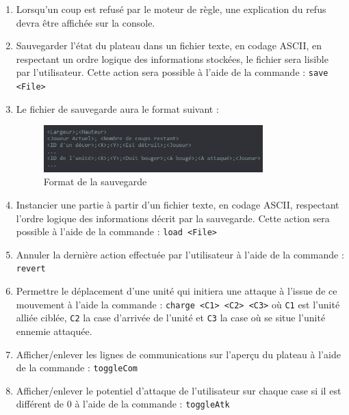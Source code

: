 \documentclass[a4paper]{report}
\begin{document}
\begin{enumerate}
\item Lorsqu'un coup est refusé par le moteur de règle, une explication du refus devra être affichée sur la console.

\item Sauvegarder l'état du plateau dans un fichier texte, en codage ASCII, en respectant un ordre logique des informations stockées, le fichier sera lisible par l'utilisateur. Cette action sera possible à l'aide de la commande : \texttt{save <File>}

\item Le fichier de sauvegarde aura le format suivant :
\begin{figure}[h]
\caption{Format de la sauvegarde}
\centering
\includegraphics[width=0.8\textwidth]{saveFormat}
\end{figure}


\item Instancier une partie à partir d'un fichier texte, en codage ASCII, respectant l'ordre logique des informations décrit par la sauvegarde. Cette action sera possible à l'aide de la commande : \texttt{load <File>}

\item Annuler la dernière action effectuée par l'utilisateur à l'aide de la commande : \texttt{revert}

\item Permettre le déplacement d'une unité qui initiera une attaque à l'issue de ce mouvement à l'aide la commande : \texttt{charge <C1> <C2> <C3>} où \texttt{C1} est l'unité alliée ciblée, \texttt{C2} la case d'arrivée de l'unité et \texttt{C3} la case où se situe l'unité ennemie attaquée.

\item Afficher/enlever les lignes de communications sur l'aperçu du plateau à l'aide de la commande : \texttt{toggleCom}

\item Afficher/enlever le potentiel d'attaque de l'utilisateur sur chaque case si il est différent de 0 à l'aide de la commande : \texttt{toggleAtk}


\end{enumerate}
\end{document}
